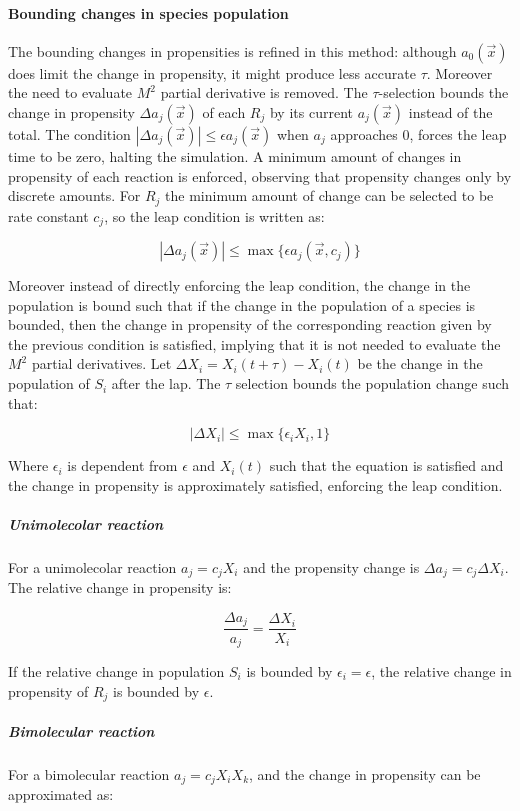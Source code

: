       \paragraph{Bounding changes in species population}
      The bounding changes in propensities is refined in this method: although $a_0(\vec{x})$ does limit the change in propensity, it might produce less accurate $\tau$.
      Moreover the need to evaluate $M^2$ partial derivative is removed.
      The $\tau$-selection bounds the change in propensity $\Delta a_j(\vec{x})$ of each $R_j$ by its current $a_j(\vec{x})$ instead of the total.
      The condition $|\Delta a_j(\vec{x})|\le \epsilon a_j(\vec{x})$ when $a_j$ approaches $0$, forces the leap time to be zero, halting the simulation.
      A minimum amount of changes in propensity of each reaction is enforced, observing that propensity changes only by discrete amounts.
      For $R_j$ the minimum amount of change can be selected to be rate constant $c_j$, so the leap condition is written as:

      $$|\Delta a_j(\vec{x})|\le\max\{\epsilon a_j(\vec{x}, c_j)\}$$

      Moreover instead of directly enforcing the leap condition, the change in the population is bound such that if the change in the population of a species is bounded, then the change in propensity of the corresponding reaction given by the previous condition is satisfied, implying that it is not needed to evaluate the $M^2$ partial derivatives.
      Let $\Delta X_i = X_i(t+\tau)-X_i(t)$ be the change in the population of $S_i$ after the lap.
      The $\tau$ selection bounds the population change such that:

      $$|\Delta X_i|\le \max\{\epsilon_i X_i, 1\}$$

      Where $\epsilon_i$ is dependent from $\epsilon$ and $X_i(t)$ such that the equation is satisfied and the change in propensity is approximately satisfied, enforcing the leap condition.
        \subparagraph{Unimolecolar reaction}
        For a unimolecolar reaction $a_j = c_jX_i$ and the propensity change is $\Delta a_j = c_j\Delta X_i$.
        The relative change in propensity is:

        $$\frac{\Delta a_j}{a_j} = \frac{\Delta X_i}{X_i}$$

        If the relative change in population $S_i$ is bounded by $\epsilon_i = \epsilon$, the relative change in propensity of $R_j$ is bounded by $\epsilon$.

        \subparagraph{Bimolecular reaction}
        For a bimolecular reaction $a_j = c_jX_iX_k$, and the change in propensity can be approximated as:

